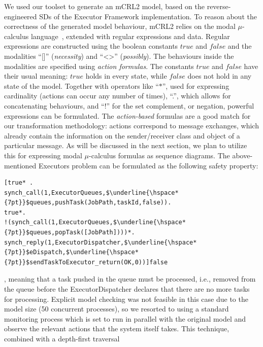 \documentclass[letter]{llncs}
\begin{document}
We used our toolset to generate an mCRL2 model, based on the reverse-engineered SDs of the Executor Framework implementation. 
To reason about the correctness of the generated model behaviour, mCRL2 relies on
the modal $\mu$-calculus language~\cite{ProcessesWithData}, extended with regular expressions and
data. Regular expressions are constructed using the boolean constants $true$ and $false$ and the modalities
``[]'' (\textit{necessity}) and ``\textless\textgreater'' (\textit{possibly}). 
The behaviours inside the modalities are specified using \emph{action formulas}.
The constants $true$ and $false$
have their usual meaning: $true$ holds in every state, while $false$ does
not hold in any state of the model. 
Together with operators like ``$\ast$'', used for expressing cardinality (actions can occur
any number of times), ``.'', which allows for concatenating behaviours, and ``!'' for the set complement, or negation, powerful expressions can be formulated.
The \emph{action-based} formulas are a good match for our transformation 
methodology: actions correspond to message exchanges, which already contain the information on the sender/receiver class
and object of a particular message. As will be discussed in the next section, we plan to utilize this 
for expressing modal $\mu$-calculus formulas as sequence diagrams.
The above-mentioned Executors problem can be formulated as the following safety property:
\begin{lstlisting}[basicstyle=\sffamily\fontsize{7}{6}\selectfont,showspaces=false,showstringspaces=false,showtabs=false,mathescape]
[true* .
synch_call(1,ExecutorQueues,$\underline{\hspace*{7pt}}$queues,pushTask(JobPath,taskId,false)).
true*.
!(synch_call(1,ExecutorQueues,$\underline{\hspace*{7pt}}$queues,popTask([JobPath])))*.
synch_reply(1,ExecutorDispatcher,$\underline{\hspace*{7pt}}$eDispatch,$\underline{\hspace*{7pt}}$sendTaskToExecutor_return(OK,0))]false 
\end{lstlisting} 
, meaning that a task pushed in the queue must be processed, i.e., removed from the queue before the ExecutorDispatcher
declares that there are no more tasks for processing.
Explicit model checking was not feasible in this case due to the model size (50 concurrent processes),
so we resorted to using a standard monitoring process which is set to run in parallel with the original model 
and observe the relevant actions that the system itself takes. This technique, combined with a depth-first traversal 
\end{document}
